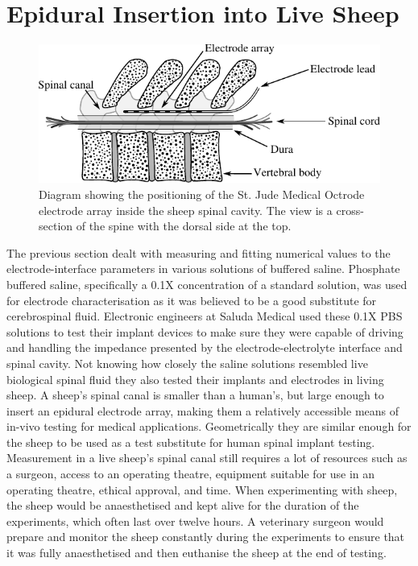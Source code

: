 
\section{Epidural Insertion into Live Sheep}
  \label{sect:sheep_measurements}


  \begin{figure}
    \centering
    \includegraphics{content/pt2/08-InterfaceParameters/graphics/sheepSpine}
    \caption{\label{fig:sheepSpine} Diagram showing the positioning of the St. Jude Medical Octrode electrode array inside the sheep spinal cavity. The view is a cross-section of the spine with the dorsal side at the top.}
  \end{figure}

  The previous section dealt with measuring and fitting numerical values to the electrode-interface parameters in various solutions of buffered saline.
  Phosphate buffered saline, specifically a 0.1X concentration of a standard solution, was used for electrode characterisation as it was believed to be a good substitute for cerebrospinal fluid.
  Electronic engineers at Saluda Medical used these 0.1X PBS solutions to test their implant devices to make sure they were capable of driving and handling the impedance presented by the electrode-electrolyte interface and spinal cavity.
  Not knowing how closely the saline solutions resembled live biological spinal fluid they also tested their implants and electrodes in living sheep.
  A sheep's spinal canal is smaller than a human's, but large enough to insert an epidural electrode array, making them a relatively accessible means of in-vivo testing for medical applications.
  Geometrically they are similar enough for the sheep to be used as a test substitute for human spinal implant testing.
  Measurement in a live sheep's spinal canal still requires a lot of resources such as a surgeon, access to an operating theatre, equipment suitable for use in an operating theatre, ethical approval, and time.
  When experimenting with sheep, the sheep would be anaesthetised and kept alive for the duration of the experiments, which often last over twelve hours.
  A veterinary surgeon would prepare and monitor the sheep constantly during the experiments to ensure that it was fully anaesthetised and then euthanise the sheep at the end of testing.

